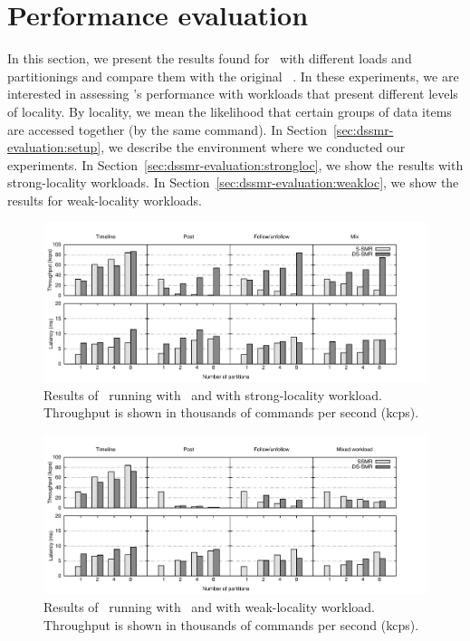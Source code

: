 \section{Performance evaluation}
\label{sec:dssmr-experiments}

In this section, we present the results found for \dssmrappname\ with different
loads and partitionings and compare them with the original
\ssmr{}~\cite{bezerra2014ssmr}. In these experiments, we are interested in
assessing \dssmr{}'s performance with workloads that present different levels of
locality. By locality, we mean the likelihood that certain groups of data items
are accessed together (by the same command). In
Section~\ref{sec:dssmr-evaluation:setup}, we describe the environment where we
conducted our experiments. In Section~\ref{sec:dssmr-evaluation:strongloc}, we
show the results with strong-locality workloads.
In Section~\ref{sec:dssmr-evaluation:weakloc}, we show the results for
weak-locality workloads.

\begin{figure}
\begin{minipage}[b]{1\linewidth}
\centering
      \includegraphics[width=1\linewidth]{figures/experiments/dssmr/strong-locality}
\end{minipage}
\caption{Results of \dssmrappname\ running with \ssmr\ and \dssmr{} with strong-locality workload. Throughput is shown in thousands of commands per second (kcps).}
\label{fig:dssmr-strongloc}
\end{figure}


\begin{figure}
\begin{minipage}[b]{1\linewidth}
\centering
      \includegraphics[width=1\linewidth]{figures/experiments/dssmr/weak-locality}
\end{minipage}
\caption{Results of \dssmrappname\ running with \ssmr\ and \dssmr{} with weak-locality workload. Throughput is shown in thousands of commands per second (kcps).}
\label{fig:dssmr-weakloc}
\end{figure}


